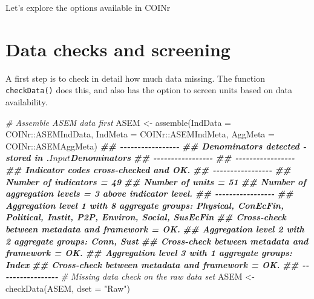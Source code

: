 \documentclass[
]{book}
\newenvironment{Shaded}{\begin{snugshade}}{\end{snugshade}}
\newcommand{\AttributeTok}[1]{\textcolor[rgb]{0.77,0.63,0.00}{#1}}
\newcommand{\CommentTok}[1]{\textcolor[rgb]{0.56,0.35,0.01}{\textit{#1}}}
\newcommand{\DocumentationTok}[1]{\textcolor[rgb]{0.56,0.35,0.01}{\textbf{\textit{#1}}}}
\newcommand{\FunctionTok}[1]{\textcolor[rgb]{0.00,0.00,0.00}{#1}}
\newcommand{\NormalTok}[1]{#1}
\newcommand{\OtherTok}[1]{\textcolor[rgb]{0.56,0.35,0.01}{#1}}
\newcommand{\SpecialCharTok}[1]{\textcolor[rgb]{0.00,0.00,0.00}{#1}}
\newcommand{\StringTok}[1]{\textcolor[rgb]{0.31,0.60,0.02}{#1}}
\begin{document}
Let's explore the options available in COINr

\hypertarget{data-checks-and-screening}{%
\section{Data checks and screening}\label{data-checks-and-screening}}

A first step is to check in detail how much data missing. The function \texttt{checkData()} does this, and also has the option to screen units based on data availability.

\begin{Shaded}
\begin{Highlighting}[]
\CommentTok{\# Assemble ASEM data first}
\NormalTok{ASEM }\OtherTok{\textless{}{-}} \FunctionTok{assemble}\NormalTok{(}\AttributeTok{IndData =}\NormalTok{ COINr}\SpecialCharTok{::}\NormalTok{ASEMIndData, }\AttributeTok{IndMeta =}\NormalTok{ COINr}\SpecialCharTok{::}\NormalTok{ASEMIndMeta,}
                 \AttributeTok{AggMeta =}\NormalTok{ COINr}\SpecialCharTok{::}\NormalTok{ASEMAggMeta)}
\DocumentationTok{\#\# {-}{-}{-}{-}{-}{-}{-}{-}{-}{-}{-}{-}{-}{-}{-}{-}{-}}
\DocumentationTok{\#\# Denominators detected {-} stored in .$Input$Denominators}
\DocumentationTok{\#\# {-}{-}{-}{-}{-}{-}{-}{-}{-}{-}{-}{-}{-}{-}{-}{-}{-}}
\DocumentationTok{\#\# {-}{-}{-}{-}{-}{-}{-}{-}{-}{-}{-}{-}{-}{-}{-}{-}{-}}
\DocumentationTok{\#\# Indicator codes cross{-}checked and OK.}
\DocumentationTok{\#\# {-}{-}{-}{-}{-}{-}{-}{-}{-}{-}{-}{-}{-}{-}{-}{-}{-}}
\DocumentationTok{\#\# Number of indicators = 49}
\DocumentationTok{\#\# Number of units = 51}
\DocumentationTok{\#\# Number of aggregation levels = 3 above indicator level.}
\DocumentationTok{\#\# {-}{-}{-}{-}{-}{-}{-}{-}{-}{-}{-}{-}{-}{-}{-}{-}{-}}
\DocumentationTok{\#\# Aggregation level 1 with 8 aggregate groups: Physical, ConEcFin, Political, Instit, P2P, Environ, Social, SusEcFin}
\DocumentationTok{\#\# Cross{-}check between metadata and framework = OK.}
\DocumentationTok{\#\# Aggregation level 2 with 2 aggregate groups: Conn, Sust}
\DocumentationTok{\#\# Cross{-}check between metadata and framework = OK.}
\DocumentationTok{\#\# Aggregation level 3 with 1 aggregate groups: Index}
\DocumentationTok{\#\# Cross{-}check between metadata and framework = OK.}
\DocumentationTok{\#\# {-}{-}{-}{-}{-}{-}{-}{-}{-}{-}{-}{-}{-}{-}{-}{-}{-}}
\CommentTok{\# Missing data check on the raw data set}
\NormalTok{ASEM }\OtherTok{\textless{}{-}} \FunctionTok{checkData}\NormalTok{(ASEM, }\AttributeTok{dset =} \StringTok{"Raw"}\NormalTok{)}

\end{Highlighting}
\end{Shaded}
\end{document}
